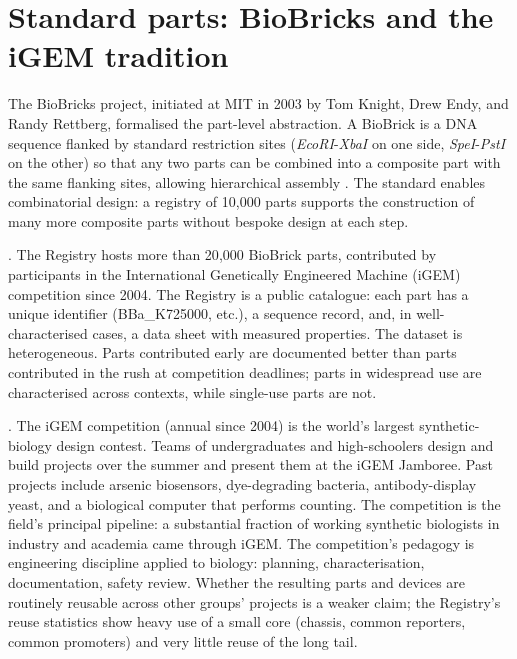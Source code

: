 \section{Standard parts: BioBricks and the iGEM tradition}

% 


The BioBricks project, initiated at MIT in 2003 by Tom Knight, Drew
Endy, and Randy Rettberg, formalised the part-level abstraction.
A BioBrick is a DNA sequence flanked by standard restriction sites
(\emph{EcoRI}-\emph{XbaI} on one side, \emph{SpeI}-\emph{PstI} on
the other) so that any two parts can be combined into a composite
part with the same flanking sites, allowing hierarchical assembly
\cite[\S\,2]{paper:v6c09-knight-biobricks-2003}. The standard enables
combinatorial design: a registry of 10{,}000 parts supports the
construction of many more composite parts without bespoke design at
each step.

. The Registry
hosts more than 20{,}000 BioBrick parts, contributed by participants
in the International Genetically Engineered Machine (iGEM)
competition since 2004. The Registry is a public catalogue: each part
has a unique identifier (BBa\_K725000, etc.), a sequence record, and,
in well-characterised cases, a data sheet with measured properties.
The dataset is heterogeneous. Parts contributed early are documented
better than parts contributed in the rush at competition deadlines;
parts in widespread use are characterised across contexts, while
single-use parts are not.

. The iGEM competition (annual since
2004) is the world's largest synthetic-biology design contest. Teams
of undergraduates and high-schoolers design and build projects over
the summer and present them at the iGEM Jamboree. Past projects
include arsenic biosensors, dye-degrading bacteria, antibody-display
yeast, and a biological computer that performs counting. The
competition is the field's principal pipeline: a substantial
fraction of working synthetic biologists in industry and academia
came through iGEM. The competition's pedagogy is engineering
discipline applied to biology: planning, characterisation,
documentation, safety review. Whether the resulting parts and
devices are routinely reusable across other groups' projects is a
weaker claim; the Registry's reuse statistics show heavy use of a
small core (chassis, common reporters, common promoters) and very
little reuse of the long tail.

